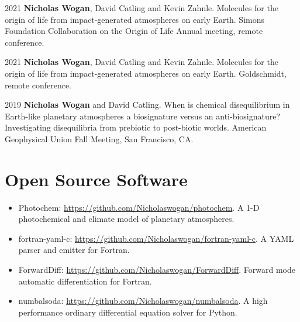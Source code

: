 \documentclass[12pt]{article}
\begin{document}
\begin{cvlist}
\item[2021]
  \textbf{Nicholas Wogan}, David Catling and Kevin Zahnle. Molecules for the origin of life from impact-generated atmospheres on early Earth. Simons Foundation Collaboration on the Origin of Life Annual meeting, remote conference.
\item[2021]
  \textbf{Nicholas Wogan}, David Catling and Kevin Zahnle. Molecules for the origin of life from impact-generated atmospheres on early Earth. Goldschmidt, remote conference.
\item[2019]
  \textbf{Nicholas Wogan} and David Catling. When is chemical disequilibrium in Earth-like planetary atmospheres a biosignature versus an anti-biosignature? Investigating disequilibria from prebiotic to post-biotic worlds. American Geophysical Union Fall Meeting, San Francisco, CA.
\end{cvlist}

\section{Open Source Software}

\begin{itemize}[itemsep=2pt]
  \item Photochem: \url{https://github.com/Nicholaswogan/photochem}. A 1-D photochemical and climate model of planetary atmospheres.
  \item fortran-yaml-c: \url{https://github.com/Nicholaswogan/fortran-yaml-c}. A YAML parser and emitter for Fortran.
  \item ForwardDiff: \url{https://github.com/Nicholaswogan/ForwardDiff}. Forward mode automatic differentiation for Fortran.
  \item numbalsoda: \url{https://github.com/Nicholaswogan/numbalsoda}. A high performance ordinary differential equation solver for Python.
\end{itemize}
\end{document}
